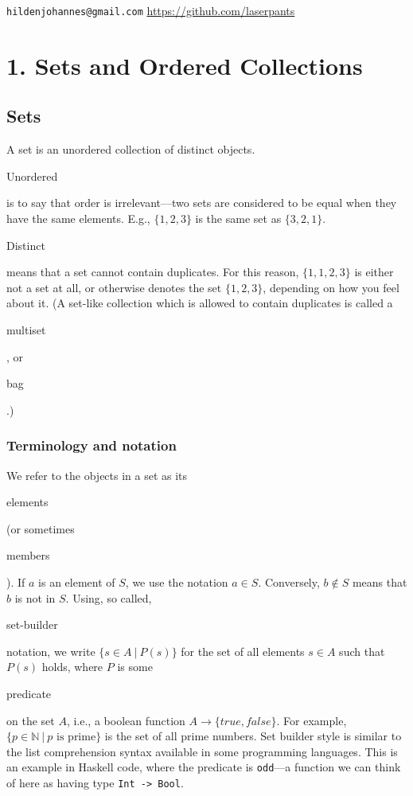 \documentclass[11pt]{article}
\theoremstyle{plain}
\theoremstyle{definition}
\begin{document}
 
\noindent \verb|hildenjohannes@gmail.com| \hfill \url{https://github.com/laserpants} 

\section*{1. Sets and Ordered Collections}

\subsection*{Sets}

A set is an unordered collection of distinct objects. \begin{em}Unordered\end{em} is to say that order is irrelevant---two sets are considered to be equal when they have the same elements. E.g., $ \{ 1, 2, 3 \} $ is the same set as $ \{ 3, 2, 1 \} $. \begin{em}Distinct\end{em} means that a set cannot contain duplicates. For this reason, $ \{ 1, 1, 2, 3 \} $ is either not a set at all, or otherwise denotes the set $ \{ 1, 2, 3 \} $, depending on how you feel about it. (A set-like collection which is allowed to contain duplicates is called a \begin{em}multiset\end{em}, or \begin{em}bag\end{em}.) 

\subsubsection*{Terminology and notation}

We refer to the objects in a set as its \begin{em}elements\end{em} (or sometimes \begin{em}members\end{em}). If $ a $ is an element of $ S $, we use the notation $ a \in S $. Conversely, $ b \notin S $ means that $ b $ is not in $ S $. Using, so called, \begin{em}set-builder\end{em} notation, we write $ \{ s \in A \ | \ P(s) \} $ for the set of all elements $ s \in A $ such that $ P(s) $ holds, where $ P $ is some \begin{em}predicate\end{em} on the set $ A $, i.e., a boolean function $ A \rightarrow \{ true, false \} $. For example, $ \{ p \in \mathbb{N} \ | \ p \text{ is prime} \} $ is the set of all prime numbers. Set builder style is similar to the list comprehension syntax available in some programming languages. This is an example in Haskell code, where the predicate is \verb|odd|---a function we can think of here as having type \verb|Int -> Bool|.
\end{document}
